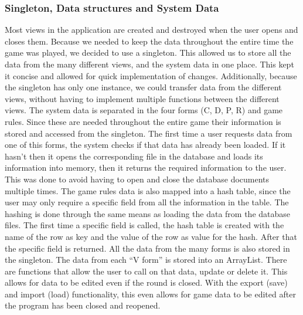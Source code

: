 \documentclass{l3proj}
\begin{document}
\subsubsection{Singleton, Data structures and System Data}
Most views in the application are created and destroyed when the user opens and closes them. Because we needed to keep the data throughout the entire time the game was played, we decided to use a singleton. This allowed us to store all the data from the many different views, and the system data in one place. This kept it concise and allowed for quick implementation of changes. Additionally, because the singleton has only one instance, we could transfer data from the different views, without having to implement multiple functions between the different views. 
The system data is separated in the four forms (C, D, P, R) and game rules. Since these are needed throughout the entire game their information is stored and accessed from the singleton. The first time a user requests data from one of this forms, the system checks if that data has already been loaded. If it hasn’t then it opens the corresponding file in the database and loads its information into memory, then it returns the required information to the user. This was done to avoid having to open and close the database documents multiple times. 
The game rules data is also mapped into a hash table, since the user may only require a specific field from all the information in the table. The hashing is done through the same means as loading the data from the database files. The first time a specific field is called, the hash table is created with the name of the row as key and the value of the row as value for the hash. After that the specific field is returned.
All the data from the many forms is also stored in the singleton. The data from each “V form” is stored into an ArrayList. There are functions that allow the user to call on that data, update or delete it. This allows for data to be edited even if the round is closed. With the export (save) and import (load) functionality, this even allows for game data to be edited after the program has been closed and reopened.
\end{document}
